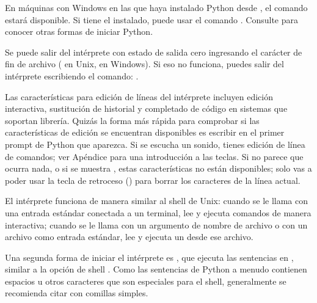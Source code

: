 \documentclass[a5paper,10pt,spanish]{sphinxmanual}
\begin{document}
\sphinxAtStartPar
En máquinas con Windows en las que haya instalado Python desde , el comando  estará disponible. Si tiene el  instalado, puede usar el comando . Consulte  para conocer otras formas de iniciar Python.

\sphinxAtStartPar
Se puede salir del intérprete con estado de salida cero ingresando el carácter de fin de archivo ( en Unix,  en Windows). Si eso no funciona, puedes salir del intérprete escribiendo el comando: .

\sphinxAtStartPar
Las características para edición de líneas del intérprete incluyen edición interactiva, sustitución de historial y completado de código en sistemas que soportan  librería. Quizás la forma más rápida para comprobar si las características de edición se encuentran disponibles es escribir  en el primer prompt de Python que aparezca. Si se escucha un sonido, tienes edición de línea de comandos; ver Apéndice {\hyperref[\detokenize{tutorial/interactive:tut-interacting}]{}} para una introducción a las teclas. Si no parece que ocurra nada, o si se muestra , estas características no están disponibles; solo vas a poder usar la tecla de retroceso () para borrar los caracteres de la línea actual.

\sphinxAtStartPar
El intérprete funciona de manera similar al shell de Unix: cuando se le llama con una entrada estándar conectada a un terminal, lee y ejecuta comandos de manera interactiva; cuando se le llama con un argumento de nombre de archivo o con un archivo como entrada estándar, lee y ejecuta un  desde ese archivo.

\sphinxAtStartPar
Una segunda forma de iniciar el intérprete es , que ejecuta las sentencias en , similar a la opción de shell  . Como las sentencias de Python a menudo contienen espacios u otros caracteres que son especiales para el shell, generalmente se recomienda citar  con comillas simples.
\end{document}
